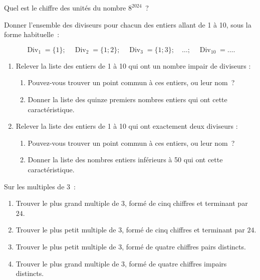 \documentclass[a4paper,12pt]{report}
\begin{document}
\vspace*{-2\baselineskip}

\begin{acti}
Quel est le chiffre des unités du nombre $8^{2024}$~? %
\end{acti}

\begin{acti}
Donner l'ensemble des diviseurs pour chacun des entiers allant de 1 à 10, sous la forme habituelle~: 

\[\operatorname{Div}_1=\{1\} ;\quad \operatorname{Div}_2=\{1 ; 2\} ;\quad \operatorname{Div}_3=\{1 ; 3\} ;\quad \ldots ;\quad \operatorname{Div}_{10}=\ldots.\]
\begin{enumerate}
\item Relever la liste des entiers de 1 à 10 qui ont un nombre impair de diviseurs :
\begin{enumerate}
\item Pouvez-vous trouver un point commun à ces entiers, ou leur nom~?
\item Donner la liste des quinze premiers nombres entiers qui ont cette caractéristique.
\end{enumerate}
\item Relever la liste des entiers de 1 à 10 qui ont exactement deux diviseurs :
\begin{enumerate}
\item Pouvez-vous trouver un point commun à ces entiers, ou leur nom~?
\item Donner la liste des nombres entiers inférieurs à 50 qui ont cette caractéristique.
\end{enumerate}
\end{enumerate}
\end{acti}



\begin{exo}
Sur les multiples de $3$~:
\begin{enumerate}
\item Trouver le plus grand multiple de $3$, formé de cinq chiffres et terminant par $24$.
\item Trouver le plus petit multiple de $3$, formé de cinq chiffres et terminant par $24$.
\item Trouver le plus petit multiple de $3$, formé de quatre chiffres pairs distincts.
\item Trouver le plus grand multiple de $3$, formé de quatre chiffres impairs distincts.
\end{enumerate}
\end{exo}
\end{document}
